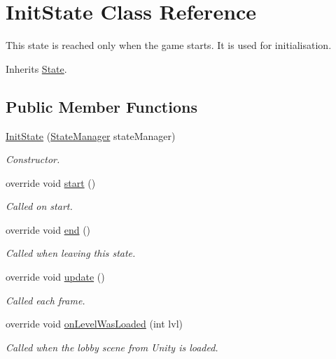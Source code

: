 \hypertarget{class_init_state}{\section{Init\-State Class Reference}
\label{class_init_state}
}


This state is reached only when the game starts. It is used for initialisation. 




Inherits \hyperlink{class_state}{State}.

\subsection*{Public Member Functions}
\begin{DoxyCompactItemize}
\item 
\hyperlink{class_init_state_a15507078e0f4ab3564c434cd189c30d5}{Init\-State} (\hyperlink{class_state_manager}{State\-Manager} state\-Manager)
\begin{DoxyCompactList}\small\item\em Constructor.\end{DoxyCompactList}\item 
override void \hyperlink{class_init_state_a03fa89130035b32e64bab0e22551dadf}{start} ()
\begin{DoxyCompactList}\small\item\em Called on start.\end{DoxyCompactList}\item 
override void \hyperlink{class_init_state_a1e50dcaa5fbf65b0e839a2ec6c6cd3f5}{end} ()
\begin{DoxyCompactList}\small\item\em Called when leaving this state.\end{DoxyCompactList}\item 
override void \hyperlink{class_init_state_a0715cfa091be8a4fb1cec405350ad396}{update} ()
\begin{DoxyCompactList}\small\item\em Called each frame.\end{DoxyCompactList}\item 
override void \hyperlink{class_init_state_aa0853b211a3c150ec00aaea4c2198249}{on\-Level\-Was\-Loaded} (int lvl)
\begin{DoxyCompactList}\small\item\em Called when the lobby scene from Unity is loaded.\end{DoxyCompactList}\item 

\end{DoxyCompactItemize}
